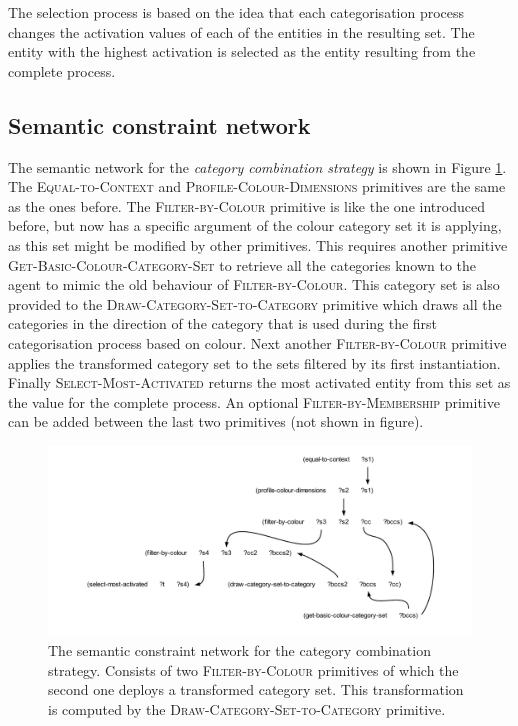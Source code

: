 The selection process is based on the idea that each categorisation
process changes the activation values of each of the entities in the
resulting set. The entity with the highest activation is selected as
the entity resulting from the complete process.

\subsection{Semantic constraint network}

The semantic network for the \emph{category combination strategy} is
shown in Figure \ref{f:ccs-semantic-program}. The
\textsc{Equal-to-Context} and \textsc{Profile-Colour-Dimensions}
primitives are the same as the ones before. The
\textsc{Filter-by-Colour} primitive is like the one introduced before,
but now has a specific argument of the colour category set it is
applying, as this set might be modified by other primitives. This
requires another primitive \textsc{Get-Basic-Colour-Category-Set} to
retrieve all the categories known to the agent to mimic the old
behaviour of \textsc{Filter-by-Colour}. This category set is also
provided to the \textsc{Draw-Category-Set-to-Category} primitive which
draws all the categories in the direction of the category that is used
during the first categorisation process based on colour. Next another
\textsc{Filter-by-Colour} primitive applies the transformed category
set to the sets filtered by its first instantiation. Finally
\textsc{Select-Most-Activated} returns the most activated entity from
this set as the value for the complete process.  An optional
\textsc{Filter-by-Membership} primitive can be added between the last
two primitives (not shown in figure).

\begin{figure}[htbp]
  \centering
  \includegraphics[width=\textwidth]{./category-combination/figures/semantic-program.pdf}
  \caption[The semantic constraint network for the category combination
  strategy]{The semantic constraint network for the category combination
      strategy. Consists of two \textsc{Filter-by-Colour} primitives
    of which the second one deploys a transformed category set. This
    transformation is computed by the
    \textsc{Draw-Category-Set-to-Category} primitive.}
  \label{f:ccs-semantic-program}
\end{figure}

